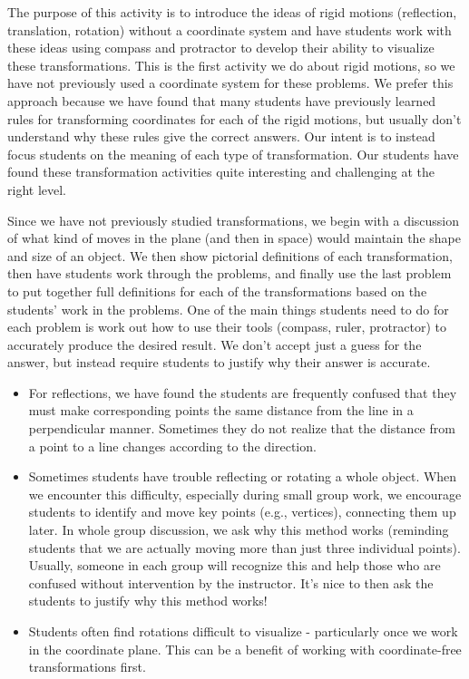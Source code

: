 \documentclass[nooutcomes]{ximera}
\begin{document}
\newpage
\begin{instructorNotes}
The purpose of this activity is to introduce the ideas of rigid motions (reflection, translation, rotation) without a coordinate system and have students work with these ideas using compass and protractor to develop their ability to visualize these transformations.  This is the first activity we do about rigid motions, so we have not previously used a coordinate system for these problems.  We prefer this approach because we have found that many students have previously learned rules for transforming coordinates for each of the rigid motions, but usually don't understand why these rules give the correct answers.  Our intent is to instead focus students on the meaning of each type of transformation.  Our students have found these transformation activities quite interesting and challenging at the right level.

Since we have not previously studied transformations, we begin with a discussion of what kind of moves in the plane (and then in space) would maintain the shape and size of an object. We then show pictorial definitions of each transformation, then have students work through the problems, and finally use the last problem to put together full definitions for each of the transformations based on the students' work in the problems.  One of the main things students need to do for each problem is work out how to use their tools (compass, ruler, protractor) to accurately produce the desired result.  We don't accept just a guess for the answer, but instead require students to justify why their answer is accurate.  
\begin{itemize}
    \item For reflections, we have found the students are frequently confused that they must make corresponding points the same distance from the line in a perpendicular manner.  Sometimes they do not realize that the distance from a point to a line changes according to the direction.  
    \item Sometimes students have trouble reflecting or rotating a whole object.  When we encounter this difficulty, especially during small group work, we encourage students to identify and move key points (e.g., vertices), connecting them up later.  In whole group discussion, we ask why this method works (reminding students that we are actually moving more than just three individual points).  Usually, someone in each group will recognize this and help those who are confused without intervention by the instructor.  It's nice to then ask the students to justify why this method works!
    \item Students often find rotations difficult to visualize - particularly once we work in the coordinate plane.  This can be a benefit of working with coordinate-free transformations first.
\end{itemize}





\end{instructorNotes}
\end{document}

